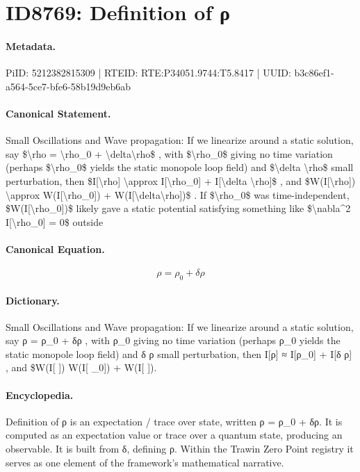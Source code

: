 \section*{ID8769: Definition of ρ}
\paragraph{Metadata.}
PiID: 5212382815309 | RTEID: RTE:P34051.9744:T5.8417 | UUID: b3c86ef1-a564-5ce7-bfe6-58b19d9eb6ab

\paragraph{Canonical Statement.}
Small Oscillations and Wave propagation: If we linearize around a static solution, say \$\textbackslash{}rho = \textbackslash{}rho\_0 + \textbackslash{}delta\textbackslash{}rho\$ , with \$\textbackslash{}rho\_0\$ giving no time variation (perhaps \$\textbackslash{}rho\_0\$ yields the static monopole loop field) and \$\textbackslash{}delta \textbackslash{}rho\$ small perturbation, then \$I[\textbackslash{}rho] \textbackslash{}approx I[\textbackslash{}rho\_0] + I[\textbackslash{}delta \textbackslash{}rho]\$ , and \$W(I[\textbackslash{}rho]) \textbackslash{}approx W(I[\textbackslash{}rho\_0]) + W(I[\textbackslash{}delta\textbackslash{}rho])\$ . If \$\textbackslash{}rho\_0\$ was time-independent, \$W(I[\textbackslash{}rho\_0])\$ likely gave a static potential satisfying something like \$\textbackslash{}nabla\textasciicircum{}2 I[\textbackslash{}rho\_0] = 0\$ outside

\paragraph{Canonical Equation.}
\[
\rho = \rho_0 + \delta\rho
\]

\paragraph{Dictionary.}
Small Oscillations and Wave propagation: If we linearize around a static solution, say ρ = ρ\_0 + δρ , with ρ\_0 giving no time variation (perhaps ρ\_0 yields the static monopole loop field) and δ ρ small perturbation, then I[ρ] ≈ I[ρ\_0] + I[δ ρ] , and \$W(I[ ]) W(I[ \_0]) + W(I[ ]).

\paragraph{Encyclopedia.}
Definition of ρ is an expectation / trace over state, written ρ = ρ\_0 + δρ. It is computed as an expectation value or trace over a quantum state, producing an observable. It is built from δ, defining ρ. Within the Trawin Zero Point registry it serves as one element of the framework's mathematical narrative.

